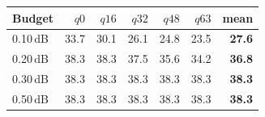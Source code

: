 \begin{tabular}{lrrrrrr}
\toprule
Budget & $q0$ & $q16$ & $q32$ & $q48$ & $q63$ & mean \\
\midrule
0.10\,dB & 33.7 & 30.1 & 26.1 & 24.8 & 23.5 & \textbf{27.6} \\
0.20\,dB & 38.3 & 38.3 & 37.5 & 35.6 & 34.2 & \textbf{36.8} \\
0.30\,dB & 38.3 & 38.3 & 38.3 & 38.3 & 38.3 & \textbf{38.3} \\
0.50\,dB & 38.3 & 38.3 & 38.3 & 38.3 & 38.3 & \textbf{38.3} \\
\bottomrule
\end{tabular}
